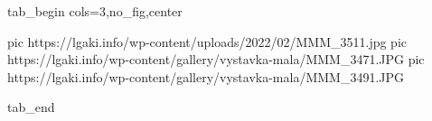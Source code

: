  
 
 
 
 


\ifcmt
  tab_begin cols=3,no_fig,center

     pic https://lgaki.info/wp-content/uploads/2022/02/MMM_3511.jpg
		 pic https://lgaki.info/wp-content/gallery/vystavka-mala/MMM_3471.JPG
		 pic https://lgaki.info/wp-content/gallery/vystavka-mala/MMM_3491.JPG

  tab_end
\fi
